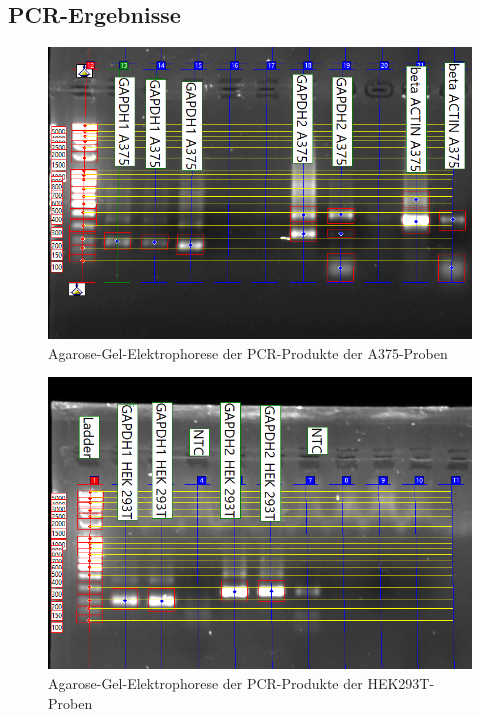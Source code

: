 \documentclass{article}
\begin{document}
\subsection*{PCR-Ergebnisse}

\begin{figure}[H]
    \centering
    \includegraphics[width=\textwidth]{images/gel/a375bp.png}
    \caption{Agarose-Gel-Elektrophorese der PCR-Produkte der A375-Proben}
    \label{fig:gela375}
\end{figure}
\begin{figure}[H]
    \centering
    \includegraphics[width=\textwidth]{images/gel/hek293T.png}
    \caption{Agarose-Gel-Elektrophorese der PCR-Produkte der HEK293T-Proben}
    \label{fig:gela375}
\end{figure}
\end{document}
